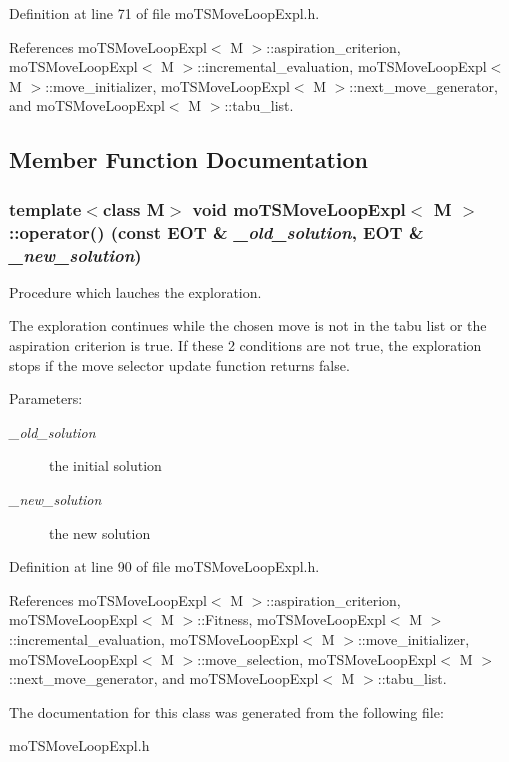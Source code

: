 Definition at line 71 of file mo\-TSMove\-Loop\-Expl.h.

References mo\-TSMove\-Loop\-Expl$<$ M $>$::aspiration\_\-criterion, mo\-TSMove\-Loop\-Expl$<$ M $>$::incremental\_\-evaluation, mo\-TSMove\-Loop\-Expl$<$ M $>$::move\_\-initializer, mo\-TSMove\-Loop\-Expl$<$ M $>$::next\_\-move\_\-generator, and mo\-TSMove\-Loop\-Expl$<$ M $>$::tabu\_\-list.

\subsection{Member Function Documentation}
\subsubsection{\setlength{\rightskip}{0pt plus 5cm}template$<$class M$>$ void {\bf mo\-TSMove\-Loop\-Expl}$<$ M $>$::operator() (const {\bf EOT} \& {\em \_\-old\_\-solution}, {\bf EOT} \& {\em \_\-new\_\-solution})\hspace{0.3cm}{\tt  [inline]}}\label{classmo_t_s_move_loop_expl_a1}


Procedure which lauches the exploration. 

The exploration continues while the chosen move is not in the tabu list or the aspiration criterion is true. If these 2 conditions are not true, the exploration stops if the move selector update function returns false.

\begin{Desc}
\item[Parameters:]
\begin{description}
\item[{\em \_\-old\_\-solution}]the initial solution \item[{\em \_\-new\_\-solution}]the new solution \end{description}
\end{Desc}


Definition at line 90 of file mo\-TSMove\-Loop\-Expl.h.

References mo\-TSMove\-Loop\-Expl$<$ M $>$::aspiration\_\-criterion, mo\-TSMove\-Loop\-Expl$<$ M $>$::Fitness, mo\-TSMove\-Loop\-Expl$<$ M $>$::incremental\_\-evaluation, mo\-TSMove\-Loop\-Expl$<$ M $>$::move\_\-initializer, mo\-TSMove\-Loop\-Expl$<$ M $>$::move\_\-selection, mo\-TSMove\-Loop\-Expl$<$ M $>$::next\_\-move\_\-generator, and mo\-TSMove\-Loop\-Expl$<$ M $>$::tabu\_\-list.

The documentation for this class was generated from the following file:\begin{CompactItemize}
\item 
mo\-TSMove\-Loop\-Expl.h\end{CompactItemize}

